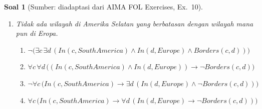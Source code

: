 \documentclass[12pt,a4paper]{article}
\theoremstyle{soaljarak}
\newtheorem{soal}{Soal}
\begin{document}
\begin{soal}[\normalfont Sumber: diadaptasi dari AIMA FOL Exercises, Ex.~10]
\begin{enumerate}
\begin{enumerate}
      \item \(\forall c\,\bigl(\mathit{Country}(c) \rightarrow (\mathit{Borders}(c,\mathit{Ecuador}) \rightarrow \mathit{In}(c,\mathit{SouthAmerica}))\bigr)\)
      \item \(\forall c\,\bigl((\mathit{Country}(c) \rightarrow \mathit{Borders}(c,\mathit{Ecuador})) \rightarrow \mathit{In}(c,\mathit{SouthAmerica})\bigr)\)
      \item \(\forall c\,\bigl(\mathit{Country}(c) \wedge \mathit{Borders}(c,\mathit{Ecuador}) \wedge \mathit{In}(c,\mathit{SouthAmerica})\bigr)\)
    \end{enumerate}
    \item Tidak ada wilayah di Amerika Selatan yang berbatasan dengan wilayah mana pun di Eropa.
    \begin{enumerate}
      \item \(\neg\bigl(\exists c\,\exists d\,(\mathit{In}(c,\mathit{SouthAmerica}) \wedge \mathit{In}(d,\mathit{Europe}) \wedge \mathit{Borders}(c,d))\bigr)\)
      \item \(\forall c\,\forall d\,\bigl((\mathit{In}(c,\mathit{SouthAmerica}) \wedge \mathit{In}(d,\mathit{Europe})) \rightarrow \neg\mathit{Borders}(c,d)\bigr)\)
      \item \(\neg\forall c\,\bigl(\mathit{In}(c,\mathit{SouthAmerica}) \rightarrow \exists d\,(\mathit{In}(d,\mathit{Europe}) \wedge \neg\mathit{Borders}(c,d))\bigr)\)
      \item \(\forall c\,\bigl(\mathit{In}(c,\mathit{SouthAmerica}) \rightarrow \forall d\,(\mathit{In}(d,\mathit{Europe}) \rightarrow \neg\mathit{Borders}(c,d))\bigr)\)
    \end{enumerate}
  \end{enumerate}
\end{soal}
\end{document}
